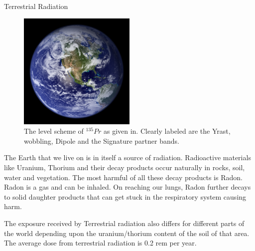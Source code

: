\documentclass[%
 amsmath,amssymb,
]{article}
\begin{document}
\begin{section}{Terrestrial Radiation}
\begin{figure}
\begin{center}
\includegraphics[width = 0.5\textwidth]{earth}
\caption{The level scheme of $^{135}Pr$ as given in. Clearly labeled are the Yrast, wobbling, Dipole and the Signature partner bands.}
\end{center}
\end{figure}

The Earth that we live on is in itself a source of radiation. Radioactive materials like Uranium, Thorium and their decay products occur naturally in rocks, soil, water and vegetation. The most harmful of all these decay products is Radon. Radon is a gas and can be inhaled. On reaching our lungs, Radon further decays to solid daughter products that can get stuck in the respiratory system causing harm.

The exposure received by Terrestrial radiation also differs for different parts of the world depending upon the uranium/thorium content of the soil of that area. The average dose from terrestrial radiation is 0.2 rem per year. 

\end{section}
\end{document}
